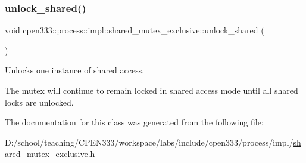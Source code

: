 \subsubsection{\texorpdfstring{unlock\+\_\+shared()}{unlock\_shared()}}
{\footnotesize\ttfamily void cpen333\+::process\+::impl\+::shared\+\_\+mutex\+\_\+exclusive\+::unlock\+\_\+shared (\begin{DoxyParamCaption}{ }\end{DoxyParamCaption})\hspace{0.3cm}{\ttfamily [inline]}}



Unlocks one instance of shared access. 

The mutex will continue to remain locked in shared access mode until all shared locks are unlocked. 

The documentation for this class was generated from the following file\+:\begin{DoxyCompactItemize}
\item 
D\+:/school/teaching/\+C\+P\+E\+N333/workspace/labs/include/cpen333/process/impl/\hyperlink{process_2impl_2shared__mutex__exclusive_8h}{shared\+\_\+mutex\+\_\+exclusive.\+h}\end{DoxyCompactItemize}
